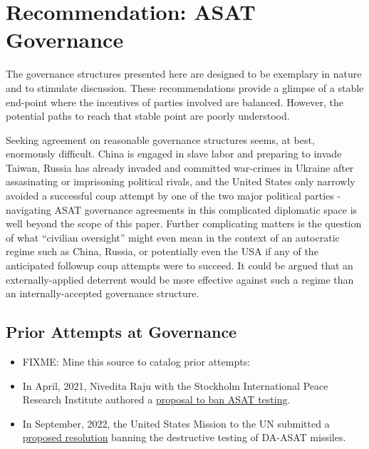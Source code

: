 \section{Recommendation: ASAT Governance}

The governance structures presented here are designed to be exemplary
in nature and to stimulate discussion.  These recommendations provide
a glimpse of a stable end-point where the incentives of parties
involved are balanced.  However, the potential paths to reach that
stable point are poorly understood.

Seeking agreement on reasonable governance structures seems, at best,
enormously difficult.  China is engaged in slave labor and preparing
to invade Taiwan, Russia has already invaded and committed war-crimes
in Ukraine after assasinating or imprisoning political rivals, and the
United States only narrowly avoided a successful coup attempt by one
of the two major political parties - navigating ASAT governance
agreements in this complicated diplomatic space is well beyond the
scope of this paper.  Further complicating matters is the question of
what ``civilian oversight'' might even mean in the context of an
autocratic regime such as China, Russia, or potentially even the USA
if any of the anticipated followup coup attempts were to succeed.  It
could be argued that an externally-applied deterrent would be more
effective against such a regime than an internally-accepted governance
structure.

\subsection{Prior Attempts at Governance}
\begin{itemize}

\item FIXME: Mine this source to catalog prior attempts:
  \cite{early-to-call}

\item In April, 2021, Nivedita Raju with the Stockholm International
  Peace Research Institute authored a
  \href{https://www.sipri.org/sites/default/files/2021-04/eunpdc_no_74.pdf}{
    proposal to ban ASAT testing}.\cite{eu-ban}

\item In September, 2022, the United States Mission to the UN
  submitted a
  \href{https://uploads.mwp.mprod.getusinfo.com/uploads/sites/25/2022/09/US-ASAT-Documents-1-1.pdf}{proposed
    resolution} banning the destructive testing of DA-ASAT missiles.

\end{itemize}


